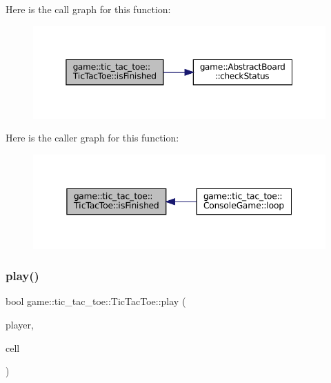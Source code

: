 Here is the call graph for this function\+:
\nopagebreak
\begin{figure}[H]
\begin{center}
\leavevmode
\includegraphics[width=350pt]{classgame_1_1tic__tac__toe_1_1_tic_tac_toe_a06463011bee6de3d33946f9162970989_cgraph}
\end{center}
\end{figure}
Here is the caller graph for this function\+:
\nopagebreak
\begin{figure}[H]
\begin{center}
\leavevmode
\includegraphics[width=345pt]{classgame_1_1tic__tac__toe_1_1_tic_tac_toe_a06463011bee6de3d33946f9162970989_icgraph}
\end{center}
\end{figure}
\mbox{\label{classgame_1_1tic__tac__toe_1_1_tic_tac_toe_a68edd6e6abdd924bc2eae503621492bb}} 
\subsubsection{\texorpdfstring{play()}{play()}}
{\footnotesize\ttfamily bool game\+::tic\+\_\+tac\+\_\+toe\+::\+Tic\+Tac\+Toe\+::play (\begin{DoxyParamCaption}\item[{\hyperlink{classgame_1_1tic__tac__toe_1_1_player}{Player} $\ast$}]{player,  }\item[{\hyperlink{classgame_1_1tic__tac__toe_1_1_board_cell}{Board\+Cell} $\ast$}]{cell }\end{DoxyParamCaption})\hspace{0.3cm}{\ttfamily [override]}}

